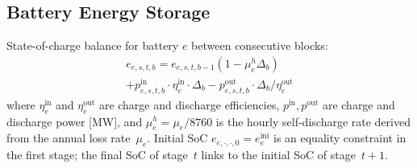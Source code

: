 \subsection{Battery Energy Storage}
\label{sec:battery}

State-of-charge balance for battery $e$ between consecutive blocks:
\begin{multline}
\label{eq:soc_balance}
e_{e,s,t,b} = e_{e,s,t,b-1}(1 - \mu_e^h \Delta_b) \\
  + p^\text{in}_{e,s,t,b} \cdot \eta^\text{in}_e \cdot \Delta_b
  - p^\text{out}_{e,s,t,b} \cdot \Delta_b / \eta^\text{out}_e
\end{multline}
where $\eta^\text{in}_e$ and $\eta^\text{out}_e$ are charge and discharge
efficiencies, $p^\text{in}, p^\text{out}$ are charge and discharge
power [MW], and $\mu_e^h = \mu_e / 8760$ is the hourly self-discharge
rate derived from the annual loss rate~$\mu_e$.
Initial SoC $e_{e,\cdot,\cdot,0} = e^\text{ini}_e$ is an
equality constraint in the first stage; the final SoC of stage~$t$
links to the initial SoC of stage~$t{+}1$.

